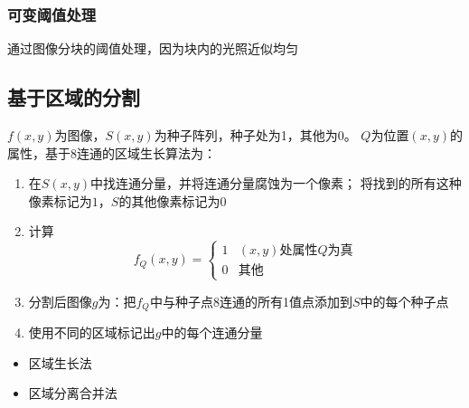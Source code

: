 \subsubsection{可变阈值处理}
通过图像分块的阈值处理，因为块内的光照近似均匀


\subsection{基于区域的分割}
$f(x,y)$为图像，$S(x,y)$为种子阵列，种子处为1，其他为0。
$Q$为位置$(x,y)$的属性，基于8连通的区域生长算法为：
\begin{enumerate}
	\item 在$S(x,y)$中找连通分量，并将连通分量腐蚀为一个像素；
	将找到的所有这种像素标记为$1$，$S$的其他像素标记为$0$
	\item 计算
	\[f_Q(x,y)=\begin{cases}
	1 & \text{$(x,y)$处属性$Q$为真}\\
	0 & \text{其他}
	\end{cases}\]
	\item 分割后图像$g$为：把$f_Q$中与种子点8连通的所有1值点添加到$S$中的每个种子点
	\item 使用不同的区域标记出$g$中的每个连通分量
\end{enumerate}

\begin{itemize}
	\item 区域生长法
	\item 区域分离合并法
\end{itemize}